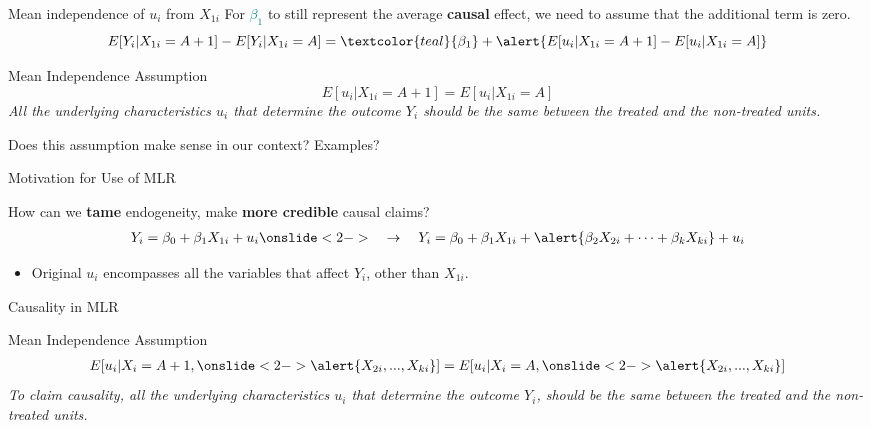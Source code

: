 \documentclass[11pt, aspectratio = 169]{beamer}
\begin{document}
\begin{frame}{Mean independence of $u_i$ from $X_{1i}$}
For \textcolor{teal}{$\beta_1$} to still represent the average \textbf{causal} effect, we need to assume that the \alert{additional term} is zero.
$$
E[Y_i | X_{1i} = A+1] - E[Y_i | X_{1i} = A] = \textcolor{teal}{\beta_1} + \alert{E[u_i | X_{1i} = A+1] - E[u_i | X_{1i} = A]}
$$
\pause
\begin{block}{Mean Independence Assumption}
\vspace{0.2cm}
$$E[u_i | X_{1i} = A+1] = E[u_i | X_{1i} = A]$$
\textit{All the underlying characteristics $u_i$ that determine the outcome $Y_i$ should be the same between the treated and the non-treated units.} 
\end{block}
\pause
Does this assumption make sense in our context? Examples?
\end{frame}

\begin{frame}{Motivation for Use of MLR}

How can we \textbf{tame} endogeneity, make \textbf{more credible} causal claims?
\begin{align*}
   Y_i = \beta_0 + \beta_1 X_{1i} + u_i 
   \onslide<2->{\quad \rightarrow \quad 
   Y_i = \beta_0 + \beta_1 X_{1i} + \alert{\beta_2 X_{2i} + \cdots + \beta_k X_{ki}} + u_i}
\end{align*}
\vspace{-0.5cm}
\begin{itemize}
    \item Original $u_i$ encompasses all the variables that affect $Y_i$, other than $X_{1i}$.
\end{itemize}
\end{frame}

\begin{frame}{Causality in MLR}
    \begin{block}{ Mean Independence Assumption}
    \begin{align*}
        E[u_i | X_i = A+1, \onslide<2->{\alert{X_{2i}, ..., X_{ki}}}] = E[u_i | X_i = A, \onslide<2->{\alert{X_{2i}, ..., X_{ki}}}]
    \end{align*}
    \textit{To claim causality, all the underlying characteristics $u_i$ that determine the outcome $Y_i$,  should be the same between the treated and the non-treated units.}
    \begin{itemize}
    \end{itemize}
\end{block}
\end{frame}
\end{document}
